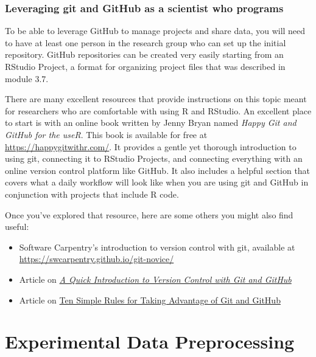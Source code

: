 \documentclass[]{tufte-book}
\providecommand{\tightlist}{%
  \setlength{\itemsep}{0pt}\setlength{\parskip}{0pt}}
\begin{document}
\subsection{Leveraging git and GitHub as a scientist who programs}\label{leveraging-git-and-github-as-a-scientist-who-programs}

To be able to leverage GitHub to manage projects and share data, you will need
to have at least one person in the research group who can set up the initial
repository. GitHub repositories can be created very easily starting from an
RStudio Project, a format for organizing project files that was described in
module 3.7.

There are many excellent resources that provide instructions on this topic
meant for researchers who are comfortable with using R and RStudio. An
excellent place to start is with an online book written by Jenny Bryan
named \emph{Happy Git and GitHub for the useR}. This book is available for free
at \url{https://happygitwithr.com/}. It provides a gentle yet thorough introduction
to using git, connecting it to RStudio Projects, and connecting everything
with an online version control platform like GitHub. It also includes a
helpful section that covers what a daily workflow will look like when you
are using git and GitHub in conjunction with projects that include R code.

Once you've explored that resource, here are some others you might also find
useful:

\begin{itemize}
\tightlist
\item
  Software Carpentry's introduction to version control with git, available at
  \url{https://swcarpentry.github.io/git-novice/}
\item
  Article on \href{https://journals.plos.org/ploscompbiol/article?id=10.1371/journal.pcbi.1004668}{\emph{A Quick Introduction to Version Control with Git and GitHub}}
  \citep{blischak2016quick}
\item
  Article on \href{https://journals.plos.org/ploscompbiol/article?id=10.1371/journal.pcbi.1004947}{Ten Simple Rules for Taking Advantage of Git and GitHub}
  \citep{perez2016ten}
\end{itemize}

\chapter{Experimental Data Preprocessing}\label{experimental-data-preprocessing}
\end{document}
